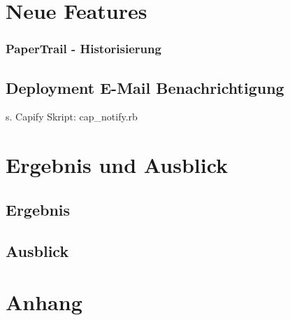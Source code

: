 \documentclass[12pt,             %
               a4paper,          %
               listof=totoc,     %
               index=totoc,      %
               bibliography=totoc,%
               oneside,         %
               BCOR1cm,          %
               english   %
               ]{scrbook}
\begin{document}
\chapter{Neue Features}
\subsection{PaperTrail - Historisierung}

\clearpage

\section{Deployment E-Mail Benachrichtigung}
s. Capify Skript: \glqq cap\_notify.rb\grqq

\chapter{Ergebnis und Ausblick}
\section{Ergebnis}
\section{Ausblick}

\clearpage
\chapter{Anhang}

\newpage
\listoffigures

\newpage
\listoftables

\newpage
\lstlistoflistings

\newpage

\end{document}
